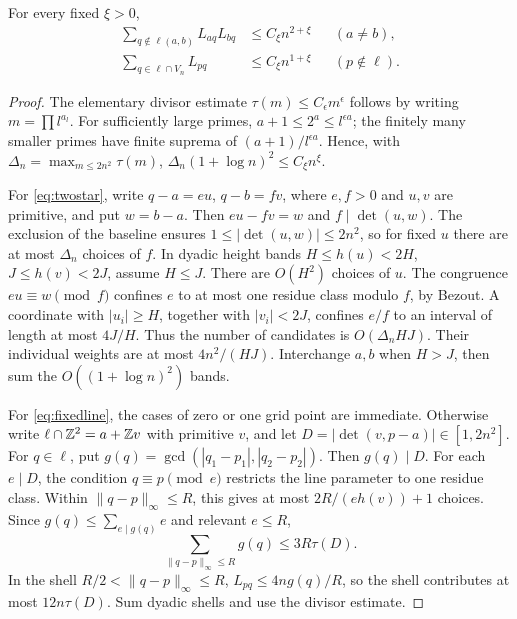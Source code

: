\begin{lemma}\label{lem:kernels}
For every fixed \(\xi>0\),
\begin{align}
 \sum_{q\notin\ell(a,b)}L_{aq}L_{bq}&\le C_\xi n^{2+\xi}
       &&(a\ne b),\label{eq:twostar}\\
 \sum_{q\in\ell\cap V_n}L_{pq}&\le C_\xi n^{1+\xi}
       &&(p\notin\ell).
       \label{eq:fixedline}
\end{align}
\end{lemma}
\begin{proof}
The elementary divisor estimate \(\tau(m)\le C_\epsilon m^\epsilon\)
follows by writing \(m=\prod l^{a_l}\). For sufficiently large primes,
\(a+1\le2^a\le l^{\epsilon a}\); the finitely many smaller primes have
finite suprema of \((a+1)/l^{\epsilon a}\). Hence, with
\(\Delta_n=\max_{m\le2n^2}\tau(m)\),
\(\Delta_n(1+\log n)^2\le C_\xi n^\xi\).

For \eqref{eq:twostar}, write \(q-a=e u\), \(q-b=f v\), where
\(e,f>0\) and \(u,v\) are primitive, and put \(w=b-a\).
Then \(eu-fv=w\) and \(f\mid\det(u,w)\). The exclusion of the baseline
ensures \(1\le|\det(u,w)|\le2n^2\), so for fixed \(u\) there are at
most \(\Delta_n\) choices of \(f\). In dyadic height bands
\(H\le h(u)<2H\), \(J\le h(v)<2J\), assume \(H\le J\).
There are \(O(H^2)\) choices of \(u\). The congruence
\(eu\equiv w\pmod f\) confines \(e\) to at most one residue class
modulo \(f\), by Bezout. A coordinate with \(|u_i|\ge H\), together
with \(|v_i|<2J\), confines \(e/f\) to an interval of length at most
\(4J/H\). Thus the number of candidates is
\(O(\Delta_n HJ)\). Their individual weights are at most
\(4n^2/(HJ)\). Interchange \(a,b\) when \(H>J\), then sum the
\(O((1+\log n)^2)\) bands.

For \eqref{eq:fixedline}, the cases of zero or one grid point are
immediate. Otherwise write \(\ell\cap\mathbb Z^2=a+\mathbb Z v\) with primitive
\(v\), and let \(D=|\det(v,p-a)|\in[1,2n^2]\).
For \(q\in\ell\), put \(g(q)=\gcd(|q_1-p_1|,|q_2-p_2|)\).
Then \(g(q)\mid D\). For each \(e\mid D\), the condition
\(q\equiv p\pmod e\) restricts the line parameter to one residue class.
Within \(\|q-p\|_\infty\le R\), this gives at most
\(2R/(e h(v))+1\) choices. Since
\(g(q)\le\sum_{e\mid g(q)}e\) and relevant \(e\le R\),
\[
 \sum_{\|q-p\|_\infty\le R}g(q)\le3R\tau(D).
\]
In the shell \(R/2<\|q-p\|_\infty\le R\),
\(L_{pq}\le4ng(q)/R\), so the shell contributes at most
\(12n\tau(D)\). Sum dyadic shells and use the divisor estimate.
\end{proof}

